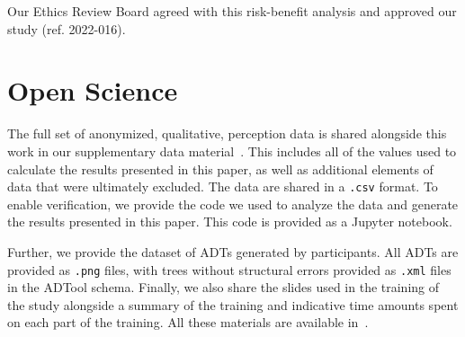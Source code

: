 Our Ethics Review Board agreed with this risk-benefit analysis and approved our study (ref. 2022-016). 



\section{Open Science}
\label{sec:open-science}

The full set of anonymized, qualitative, perception data is shared alongside this work in our supplementary data material~\cite{zenodo-dataset}. This includes all of the values used to calculate the results presented in this paper, as well as additional elements of data that were ultimately excluded.  The data are shared in a \texttt{.csv} format. To enable verification, we provide the code we used to analyze the data and generate the results presented in this paper. This code is provided as a Jupyter notebook.

Further, we provide the dataset of ADTs generated by participants. All ADTs are provided as \texttt{.png} files, with trees without structural errors provided as \texttt{.xml} files in the ADTool schema. 
Finally, we also share the slides used in the training of the study alongside a summary of the training and indicative time amounts spent on each part of the training. All these materials are available in~\cite{zenodo-dataset}.